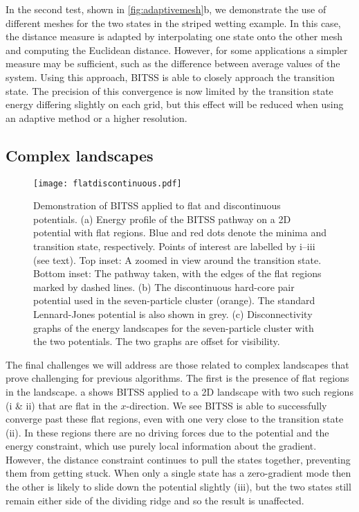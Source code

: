 \documentclass[aip,jcp,reprint,twocolumn]{revtex4-1}
\begin{document}
In the second test, shown in \cref{fig:adaptivemesh}b, we demonstrate the use of different meshes for the two states in the striped wetting example.
In this case, the distance measure is adapted by interpolating one state onto the other mesh and computing the Euclidean distance.
However, for some applications a simpler measure may be sufficient, such as the difference between average values of the system.
Using this approach, BITSS is able to closely approach the transition state.
The precision of this convergence is now limited by the transition state energy differing slightly on each grid, but this effect will be reduced when using an adaptive method or a higher resolution.


\subsection{Complex landscapes}
\begin{figure}[tb]
  \texttt{[image: flatdiscontinuous.pdf]}
  \caption{\label{fig:flatdiscontinuous}
    Demonstration of BITSS applied to flat and discontinuous potentials.
    (a) Energy profile of the BITSS pathway on a 2D potential with flat regions.
        Blue and red dots denote the minima and transition state, respectively.
        Points of interest are labelled by i--iii (see text).
        Top inset: A zoomed in view around the transition state.
        Bottom inset: The pathway taken, with the edges of the flat regions marked by dashed lines.
    (b) The discontinuous hard-core pair potential used in the seven-particle cluster (orange).
        The standard Lennard-Jones potential is also shown in grey.
    (c) Disconnectivity graphs of the energy landscapes for the seven-particle cluster with the two potentials.
        The two graphs are offset for visibility.
  }
\end{figure}

The final challenges we will address are those related to complex landscapes that prove challenging for previous algorithms.
The first is the presence of flat regions in the landscape.
a shows BITSS applied to a 2D landscape with two such regions (i \& ii) that are flat in the $x$-direction.
We see BITSS is able to successfully converge past these flat regions, even with one very close to the transition state (ii).
In these regions there are no driving forces due to the potential and the energy constraint, which use purely local information about the gradient.
However, the distance constraint continues to pull the states together, preventing them from getting stuck.
When only a single state has a zero-gradient mode then the other is likely to slide down the potential slightly (iii), but the two states still remain either side of the dividing ridge and so the result is unaffected.
\end{document}
